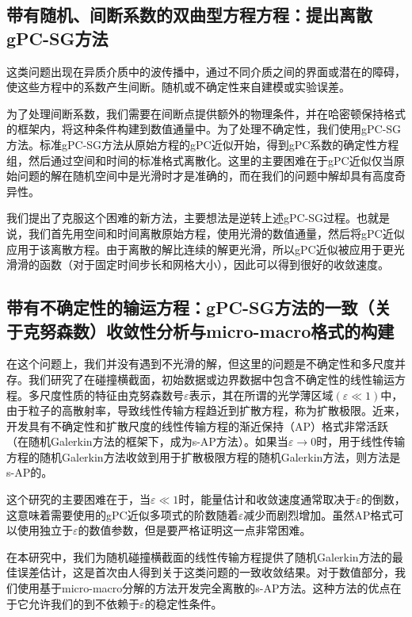 \subsection{带有随机、间断系数的双曲型方程方程：提出离散gPC-SG方法}

这类问题出现在异质介质中的波传播中，通过不同介质之间的界面或潜在的障碍，使这些方程中的系数产生间断。随机或不确定性来自建模或实验误差。

为了处理间断系数，我们需要在间断点提供额外的物理条件，并在哈密顿保持格式的框架内，将这种条件构建到数值通量中。为了处理不确定性，我们使用gPC-SG方法。标准gPC-SG方法从原始方程的gPC近似开始，得到gPC系数的确定性方程组，然后通过空间和时间的标准格式离散化。这里的主要困难在于gPC近似仅当原始问题的解在随机空间中是光滑时才是准确的，而在我们的问题中解却具有高度奇异性。

我们提出了克服这个困难的新方法，主要想法是逆转上述gPC-SG过程。也就是说，我们首先用空间和时间离散原始方程，使用光滑的数值通量，然后将gPC近似应用于该离散方程。由于离散的解比连续的解更光滑，所以gPC近似被应用于更光滑滑的函数（对于固定时间步长和网格大小），因此可以得到很好的收敛速度。

\subsection{带有不确定性的输运方程：gPC-SG方法的一致（关于克努森数）收敛性分析与micro-macro格式的构建}

在这个问题上，我们并没有遇到不光滑的解，但这里的问题是不确定性和多尺度并存。我们研究了在碰撞横截面，初始数据或边界数据中包含不确定性的线性输运方程。多尺度性质的特征由克努森数号$\varepsilon$表示，其在所谓的光学薄区域$(\varepsilon \ll 1)$中，由于粒子的高散射率，导致线性传输方程趋近到扩散方程，称为扩散极限。近来，开发具有不确定性和扩散尺度的线性传输方程的渐近保持（AP）格式非常活跃（在随机Galerkin方法的框架下，成为s-AP方法）\cite{JXZ}。如果当$ \varepsilon \rightarrow 0 $时，用于线性传输方程的随机Galerkin方法收敛到用于扩散极限方程的随机Galerkin方法，则方法是s-AP的。

这个研究的主要困难在于，当$\varepsilon \ll 1 $时，能量估计和收敛速度通常取决于$\varepsilon $的倒数，这意味着需要使用的gPC近似多项式的阶数随着$\varepsilon $减少而剧烈增加。虽然AP格式可以使用独立于$\varepsilon $的数值参数，但是要严格证明这一点非常困难。

在本研究中，我们为随机碰撞横截面的线性传输方程提供了随机Galerkin方法的最佳误差估计，这是首次由人得到关于这类问题的一致收敛结果。对于数值部分，我们使用基于micro-macro分解的方法开发完全离散的s-AP方法。这种方法的优点在于它允许我们的到不依赖于$\varepsilon$的稳定性条件。

